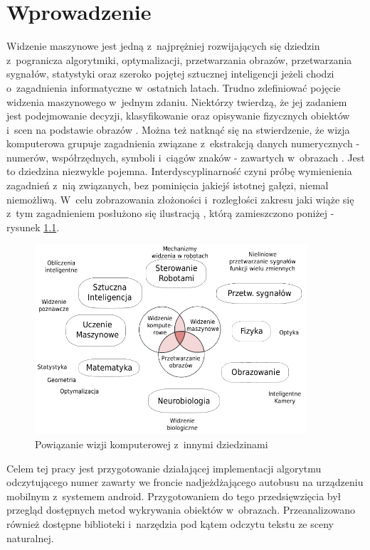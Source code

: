 \chapter{Wprowadzenie}

Widzenie maszynowe jest jedną z~najprężniej rozwijających się
dziedzin z~pogranicza algorytmiki, optymalizacji, przetwarzania obrazów,
przetwarzania sygnałów, statystyki oraz szeroko pojętej sztucznej
inteligencji jeżeli chodzi o~zagadnienia informatyczne w~ostatnich
latach. Trudno zdefiniować pojęcie widzenia maszynowego w~jednym
zdaniu. Niektórzy twierdzą, że jej zadaniem jest podejmowanie
decyzji, klasyfikowanie oraz opisywanie fizycznych obiektów
i~scen na podstawie obrazów \cite{ShapiroStockman200102}.
Można też natknąć się na stwierdzenie, że wizja komputerowa 
grupuje zagadnienia związane z~ekstrakcją danych numerycznych -
numerów, współrzędnych, symboli i~ciągów znaków - zawartych w~obrazach
\cite{morris2004computer}. Jest to dziedzina niezwykle pojemna. 
Interdyscyplinarność czyni próbę wymienienia zagadnień z~nią związanych,
bez pominięcia jakiejś istotnej gałęzi, niemal niemożliwą. 
W~celu zobrazowania złożoności i~rozległości zakresu jaki wiąże się
z~tym zagadnieniem posłużono się ilustracją \cite{wiki:computervision}, 
którą zamieszczono poniżej - rysunek 
\ref{fig:int_cv_inter_discip}.

\begin{figure}[!h]
    \centering
    \includegraphics[width=0.9\textwidth]{img/int_cv_inter_discip}
    \caption{Powiązanie wizji komputerowej z~innymi dziedzinami}
    \label{fig:int_cv_inter_discip}
\end{figure}

Celem tej pracy jest przygotowanie działającej implementacji
algorytmu odczytującego numer zawarty we froncie nadjeżdżającego
autobusu na urządzeniu mobilnym z~systemem android. Przygotowaniem
do tego przedsięwzięcia był przegląd dostępnych metod wykrywania
obiektów w~obrazach. Przeanalizowano również dostępne biblioteki 
i~narzędzia pod kątem odczytu tekstu ze sceny naturalnej.

